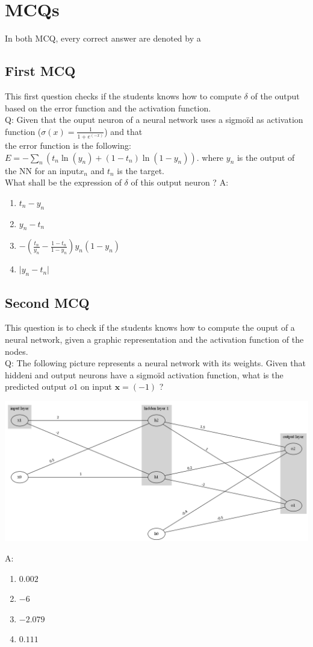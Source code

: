 \documentclass[a4paper, 10pt]{article}
\begin{document}
\section{MCQs}
In both MCQ, every correct answer are denoted by a \textdagger
\subsection{First MCQ}
This first question checks if the students knows how to compute $\delta$ of the output based on the error 
function and the activation function. 
\\
Q: Given that the ouput neuron of a neural network uses a sigmoïd as activation function ($\sigma(x) = \frac{1}{1+e^{(-x)}}$) and that 
\\the error function is the following: $E=- \sum_n(t_n\ln (y_n)  +(1-t_n)\ln (1-y_n))$.
where $y_n$ is the output of the NN for an input$x_n$ and $t_n$ is the target.
\\
What shall be the expression of $\delta$ of this output neuron ?
A:
\begin{enumerate}
   \item $t_n - y_n$
   \item $y_n - t_n$ \textdagger
   \item $-\left(\frac{t_n}{y_n}-\frac{1-t_n}{1-y_n}\right)y_n(1-y_n)$ \textdagger
   \item $\vert y_n-t_n\vert$
\end{enumerate}

\subsection{Second MCQ}
This question is to check if the students knows how to compute the ouput of a neural network,
given a graphic representation and the activation function of the nodes.
\\
Q: The following picture represents a neural network with its weights. Given that hiddeni and output neurons have a sigmoïd activation
function, what is the predicted output $o1$ on input $\bm{x} = (-1)$ ? 
\begin{center}
    \includegraphics[scale=0.35]{mcq_graph_export}
\end{center}
A:
\begin{enumerate}
   \item $0.002$
   \item $-6$ 
   \item $-2.079$
   \item $0.111$ \textdagger
\end{enumerate}
\end{document}
